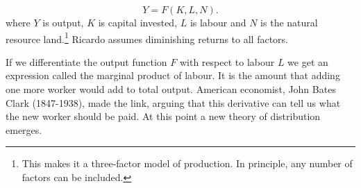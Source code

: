 \begin{equation} 
Y=F(K,L,N).
\label{eqn-production-ricardo}
\end{equation} 
where $Y$ is output, $K$ is capital invested, $L$ is labour and $N$ is the natural resource land.\footnote{This makes it a three-factor model of production.  In principle, any number of factors can be included.}  Ricardo assumes diminishing returns to all factors. 

If we differentiate the output function $F$ with respect to labour $L$ we get an expression called the \gls{marginal product} of labour. It is the amount that adding one more worker would add to total output. American economist, John Bates Clark (1847-1938), made the link, 
arguing that this derivative can tell us what the new worker should be paid. At this point a new theory of distribution emerges.  %


